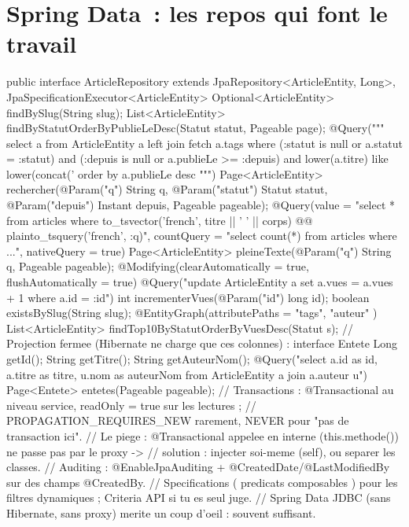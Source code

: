 \documentclass[12pt,a4paper,twoside,openright]{book}
\begin{document}
\section{Spring Data~: les repos qui font le travail}

\begin{codejava}
public interface ArticleRepository extends JpaRepository<ArticleEntity, Long>, JpaSpecificationExecutor<ArticleEntity> {
    Optional<ArticleEntity> findBySlug(String slug);
    List<ArticleEntity> findByStatutOrderByPublieLeDesc(Statut statut, Pageable page);
    @Query("""
           select a from ArticleEntity a left join fetch a.tags
           where (:statut is null or a.statut = :statut)
             and (:depuis is null or a.publieLe >= :depuis)
             and lower(a.titre) like lower(concat('%
           order by a.publieLe desc
           """)
    Page<ArticleEntity> rechercher(@Param("q") String q, @Param("statut") Statut statut,
                                   @Param("depuis") Instant depuis, Pageable pageable);
    @Query(value = "select * from articles where to_tsvector('french', titre || ' ' || corps) @@ plainto_tsquery('french', :q)",
           countQuery = "select count(*) from articles where ...", nativeQuery = true)
    Page<ArticleEntity> pleineTexte(@Param("q") String q, Pageable pageable);
    @Modifying(clearAutomatically = true, flushAutomatically = true)
    @Query("update ArticleEntity a set a.vues = a.vues + 1 where a.id = :id")
    int incrementerVues(@Param("id") long id);
    boolean existsBySlug(String slug);
    @EntityGraph(attributePaths = { "tags", "auteur" }) List<ArticleEntity> findTop10ByStatutOrderByVuesDesc(Statut s);
}
// Projection fermee (Hibernate ne charge que ces colonnes) :
interface Entete { Long getId(); String getTitre(); String getAuteurNom(); }
@Query("select a.id as id, a.titre as titre, u.nom as auteurNom from ArticleEntity a join a.auteur u")
Page<Entete> entetes(Pageable pageable);
// Transactions : @Transactional au niveau service, readOnly = true sur les lectures ;
// PROPAGATION_REQUIRES_NEW rarement, NEVER pour "pas de transaction ici".
// Le piege : @Transactional appelee en interne (this.methode()) ne passe pas par le proxy ->
// solution : injecter soi-meme (self), ou separer les classes.
// Auditing : @EnableJpaAuditing + @CreatedDate/@LastModifiedBy sur des champs @CreatedBy.
// Specifications ( predicats composables ) pour les filtres dynamiques ; Criteria API si tu es seul juge.
// Spring Data JDBC (sans Hibernate, sans proxy) merite un coup d'oeil : souvent suffisant.
\end{codejava}
\end{document}
